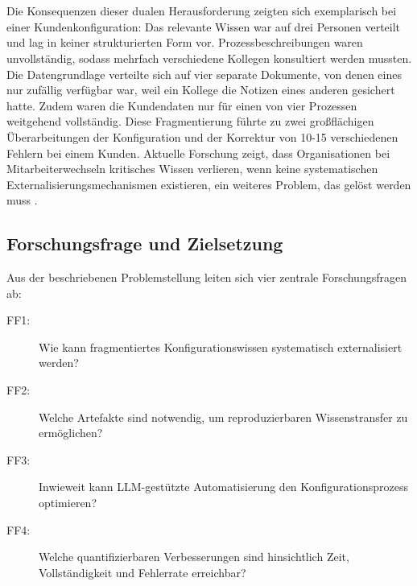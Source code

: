 \\\\
Die Konsequenzen dieser dualen Herausforderung zeigten sich exemplarisch bei einer Kundenkonfiguration: Das relevante Wissen war auf drei Personen verteilt und lag in keiner strukturierten Form vor. Prozessbeschreibungen waren unvollständig, sodass mehrfach verschiedene Kollegen konsultiert werden mussten. Die Datengrundlage verteilte sich auf vier separate Dokumente, von denen eines nur zufällig verfügbar war, weil ein Kollege die Notizen eines anderen gesichert hatte. Zudem waren die Kundendaten nur für einen von vier Prozessen weitgehend vollständig. Diese Fragmentierung führte zu zwei großflächigen Überarbeitungen der Konfiguration und der Korrektur von 10-15 verschiedenen Fehlern bei einem Kunden. Aktuelle Forschung zeigt, dass Organisationen bei Mitarbeiterwechseln kritisches Wissen verlieren, wenn keine systematischen Externalisierungsmechanismen existieren, ein weiteres Problem, das gelöst werden muss \citep{llm:tacit_knowledge2025}.


\subsection{Forschungsfrage und Zielsetzung}
\label{subsec:Forschungsfrage}

Aus der beschriebenen Problemstellung leiten sich vier zentrale Forschungsfragen ab:

\begin{description}
    \item[FF1:] Wie kann fragmentiertes Konfigurationswissen systematisch externalisiert werden?
    \item[FF2:] Welche Artefakte sind notwendig, um reproduzierbaren Wissenstransfer zu ermöglichen?
    \item[FF3:] Inwieweit kann LLM-gestützte Automatisierung den Konfigurationsprozess optimieren?
    \item[FF4:] Welche quantifizierbaren Verbesserungen sind hinsichtlich Zeit, Vollständigkeit und Fehlerrate erreichbar?
\end{description}

